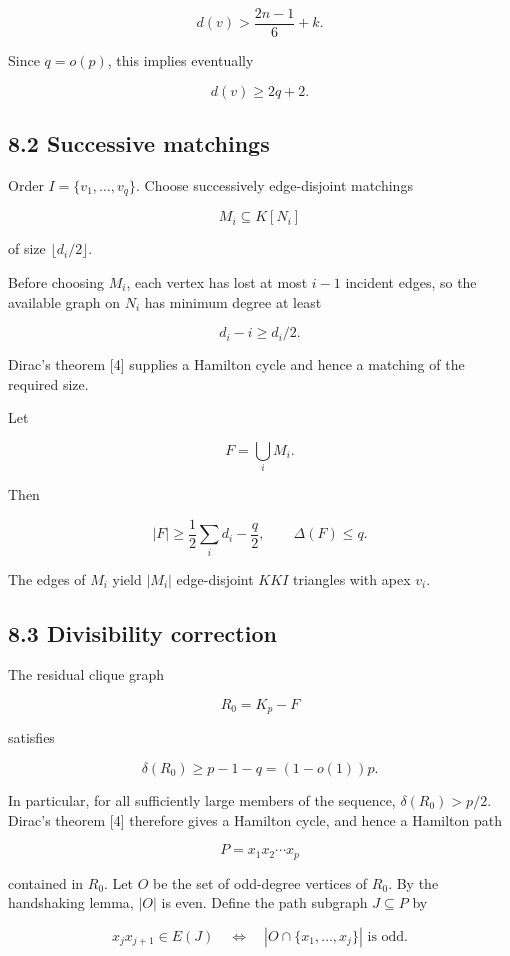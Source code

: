 \documentclass[
  11pt,
]{article}
\begin{document}
\[
d(v)>
\frac{2n-1}{6}+k.
\tag{8.1}
\]

Since \(q=o(p)\), this implies eventually

\[
d(v)\ge2q+2.
\tag{8.2}
\]

\subsection{8.2 Successive matchings}\label{successive-matchings}

Order \(I=\{v_1,\ldots,v_q\}\). Choose successively edge-disjoint matchings

\[
M_i\subseteq K[N_i]
\]

of size \(\lfloor d_i/2\rfloor\).

Before choosing \(M_i\), each vertex has lost at most \(i-1\) incident edges, so the available graph on \(N_i\) has minimum degree at least

\[
d_i-i\ge d_i/2.
\]

Dirac's theorem {[}4{]} supplies a Hamilton cycle and hence a matching of the required size.

Let

\[
F=\bigcup_iM_i.
\]

Then

\[
|F|
\ge
\frac12\sum_i d_i-\frac q2,
\qquad
\Delta(F)\le q.
\tag{8.3}
\]

The edges of \(M_i\) yield \(|M_i|\) edge-disjoint \(KKI\) triangles with apex \(v_i\).

\subsection{8.3 Divisibility correction}\label{divisibility-correction}

The residual clique graph

\[
R_0=K_p-F
\]

satisfies

\[
\delta(R_0)
\ge
p-1-q
=(1-o(1))p.
\tag{8.4}
\]

In particular, for all sufficiently large members of the sequence, \(\delta(R_0)>p/2\). Dirac's theorem {[}4{]} therefore gives a Hamilton cycle, and hence a Hamilton path

\[
P=x_1x_2\cdots x_p
\]

contained in \(R_0\). Let \(O\) be the set of odd-degree vertices of \(R_0\). By the handshaking lemma, \(|O|\) is even. Define the path subgraph \(J\subseteq P\) by

\[
x_jx_{j+1}\in E(J)
\quad\Longleftrightarrow\quad
|O\cap\{x_1,\ldots,x_j\}|\text{ is odd}.
\tag{8.5}
\]
\end{document}
